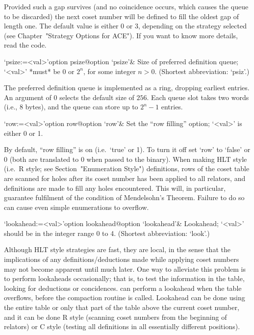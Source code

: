 Provided such a gap survives (and no coincidence occurs, which  causes
the queue to be discarded) the next coset number will  be  defined  to
fill the oldest gap of length one. The default value is either 0 or 3,
depending on the strategy selected (see Chapter~"Strategy Options  for
ACE"). If you want to know more details, read the code.


\>`psize:=<val>'{option psize}@{option `psize'}&
Size of preferred definition queue; `<val>' *must* be 0 or $2^n$,  for
some integer $n>0$. (Shortest abbreviation: `psiz'.)

The  preferred definition  queue is  implemented as  a  ring, dropping
earliest entries. An argument of 0 selects  the default size of $256$.
Each  queue slot takes two words (i.e., 8 bytes),  and the  queue  can
store up to $2^n-1$ entries.

\enditems


\beginitems

\>`row:=<val>'{option row}@{option `row'}&
Set the ``row filling'' option; `<val>' is either 0 or 1.

By default, ``row filling'' is on (i.e.~`true' or 1). To turn  it  off
set `row' to `false' or 0 (both are translated to 0 when passed to the
{\ACE}  binary).  When   making   HLT   style   (i.e.~R   style;   see
Section~"Enumeration Style") definitions, rows of the coset table  are
scanned for holes after its coset  number  has  been  applied  to  all
relators, and definitions are made to fill any holes encountered. This
will,  in  particular,  guarantee  fulfilment  of  the  condition   of
Mendelsohn's  Theorem.  Failure  to  do  so  can  cause  even   simple
enumerations to overflow.

\>`lookahead:=<val>'{option lookahead}@{option `lookahead'}&
Lookahead; `<val>' should be in the integer range 0 to 4.
(Shortest abbreviation: `look'.)
  
Although HLT style strategies are fast, they are local, in  the  sense
that  the  implications  of  any  definitions/deductions  made   while
applying coset numbers may not become apparent until much  later.  One
way to alleviate this problem is to perform  lookaheads  occasionally;
that is, to test the information in the table, looking for  deductions
or  concidences.  {\ACE}  can  perform  a  lookahead  when  the  table
overflows, before the compaction routine is called. Lookahead  can  be
done using the entire table or only that part of the table  above  the
current coset number, and it  can  be  done  R style  (scanning  coset
numbers from the  beginning  of  relators)  or  C style  (testing  all
definitions in all essentially different positions).

